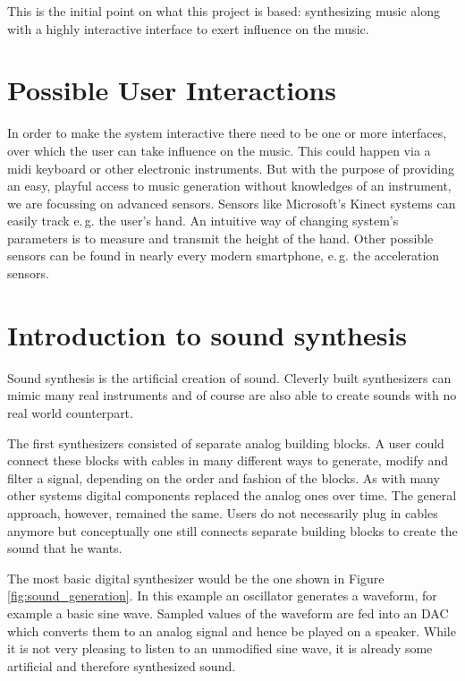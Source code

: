 	This is the initial point on what this project is based: synthesizing music along with a highly interactive interface to exert influence on the music.

	\section{Possible User Interactions}
	In order to make the system interactive there need to be one or more interfaces, over which the user can take influence on the music. This could happen via a midi keyboard or other electronic instruments. But with the purpose of providing an easy, playful access to music generation without knowledges of an instrument, we are focussing on advanced sensors. Sensors like Microsoft's Kinect systems can easily track e.\,g. the user's hand. An intuitive way of changing system's parameters is to measure and transmit the height of the hand. Other possible sensors can be found in nearly every modern smartphone, e.\,g. the acceleration sensors.
	
			
				
	\section{Introduction to sound synthesis}
		Sound synthesis is the artificial creation of sound. 
		Cleverly built synthesizers can mimic many real instruments 
		and of course are also able to create sounds with no real world counterpart.
		
		The first synthesizers consisted of separate analog building blocks.
		A user could connect these blocks with cables in many different ways to generate, modify and filter a signal, depending on the order and fashion of the blocks.
		As with many other systems digital components replaced the analog ones over time.
		The general approach, however, remained the same. 
		Users do not necessarily plug in cables anymore but conceptually one still connects separate building blocks to create the sound that he wants.
		
		The most basic digital synthesizer would be the one shown in Figure \ref{fig:sound_generation}. 
		In this example an oscillator generates a waveform, for example a basic sine wave.
		Sampled values of the waveform are fed into an \ac{DAC} which converts them to an analog signal and hence be played on a speaker.
		While it is not very pleasing to listen to an unmodified sine wave, it is already some artificial and therefore synthesized sound.
		
